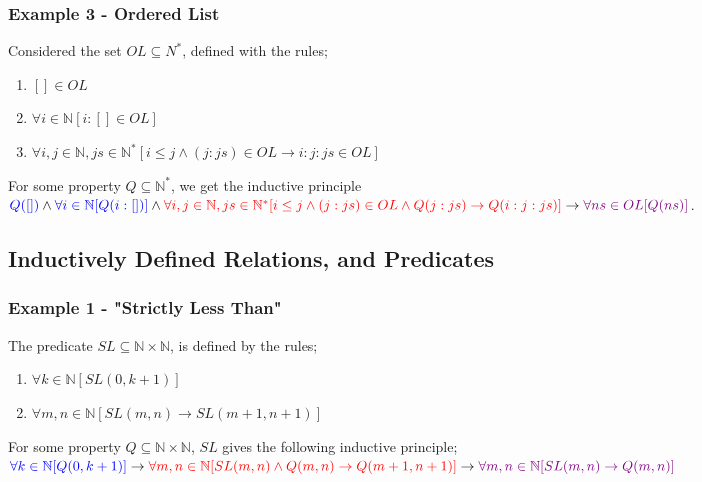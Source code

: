 \documentclass[a4paper, 12pt]{article}
\begin{document}
            \subsubsection*{Example 3 - Ordered List}
                Considered the set $OL \subseteq N^*$, defined with the rules;
                \begin{enumerate}[R1]
                    \itemsep0em
                    \item $[] \in OL$
                    \item $\forall i \in \mathbb{N} [i : [] \in OL]$
                    \item $\forall i, j \in \mathbb{N}, js \in \mathbb{N}^* [i \leq j \land (j : js) \in OL \rightarrow i : j : js \in OL]$
                \end{enumerate}
                For some property $Q \subseteq \mathbb{N}^*$, we get the inductive principle $\textcolor{blue}{Q([])} \land \textcolor{blue}{\forall i \in \mathbb{N} [Q(i : [])]} \land \\ \textcolor{red}{\forall i, j \in \mathbb{N}, js \in \mathbb{N}^* [i \leq j \land (j : js) \in OL \land Q(j : js) \rightarrow Q(i : j : js)]} \rightarrow \textcolor{violet}{\forall ns \in OL [Q(ns)]}$.
        \subsection*{Inductively Defined Relations, and Predicates}
            \subsubsection*{Example 1 - "Strictly Less Than"}
                The predicate $SL \subseteq \mathbb{N} \times \mathbb{N}$, is defined by the rules;
                \begin{enumerate}[R1]
                    \itemsep0em
                    \item $\forall k \in \mathbb{N} [SL(0, k + 1)]$
                    \item $\forall m, n \in \mathbb{N} [SL(m, n) \rightarrow SL(m + 1, n + 1)]$
                \end{enumerate}
                For some property $Q \subseteq \mathbb{N} \times \mathbb{N}$, $SL$ gives the following inductive principle; $\textcolor{blue}{\forall k \in \mathbb{N} [Q(0, k + 1)]} \rightarrow \textcolor{red}{\forall m, n \in \mathbb{N} [SL(m, n) \land Q(m, n) \rightarrow Q(m + 1, n + 1)]} \rightarrow \textcolor{violet}{\forall m, n \in \mathbb{N} [SL(m, n) \rightarrow Q(m, n)]}$
\end{document}
